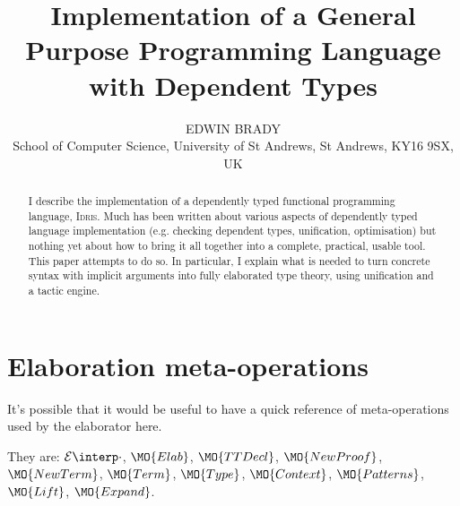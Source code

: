 \documentclass{jfp1}
\title[Implementation of a General Purpose Language with Dependent Types]
  {Implementation of a General Purpose Programming Language with Dependent Types}
\author[Edwin Brady]
{EDWIN BRADY\\
School of Computer Science, University of St Andrews, St Andrews,
KY16 9SX, UK}
\newcounter{per}
\newcommand{\Idris}{\textsc{Idris}}
\begin{document}
\maketitle

\begin{abstract}
I describe the implementation of a dependently typed functional
programming language, \Idris{}. Much has been written about various
aspects of dependently typed language implementation (e.g. checking
dependent types, unification, optimisation) but nothing yet about how
to bring it all together into a complete, practical, usable tool. This paper
attempts to do so. In particular, I explain what is needed to turn 
concrete syntax with implicit arguments into fully elaborated type
theory, using unification and a tactic engine.
\end{abstract}












%





%






\appendix

\section{Elaboration meta-operations}

It's possible that it would be useful to have a quick reference of meta-operations
used by the elaborator here.

They are: $\ttinterp{\cdot}$, $\MO{Elab}$, $\MO{TTDecl}$,
$\MO{NewProof}$, $\MO{NewTerm}$,
$\MO{Term}$, $\MO{Type}$, $\MO{Context}$, $\MO{Patterns}$, $\MO{Lift}$, $\MO{Expand}$.

%
\end{document}
